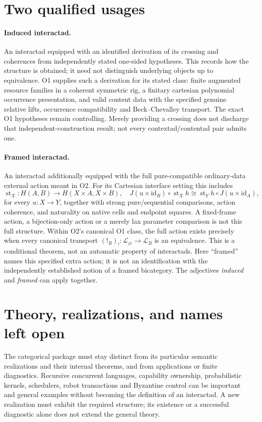 \documentclass[11pt]{article}
\begin{document}
\section{Two qualified usages}
\paragraph{Induced interactad.}
An interactad equipped with an identified derivation of its crossing and
coherences from independently stated one-sided hypotheses. This records
how the structure is obtained; it need not distinguish underlying objects
up to equivalence. O1 supplies such a derivation for its stated class:
finite augmented resource families in a coherent symmetric rig, a finitary
cartesian polynomial occurrence presentation, and valid content data with
the specified genuine relative lifts, occurrence compatibility and
Beck--Chevalley transport. The exact O1 hypotheses remain controlling.
Merely providing a crossing does not discharge that independent-construction
result; not every contextad/contentad pair admits one.

\paragraph{Framed interactad.}
An interactad additionally equipped with the full pure-compatible
ordinary-data external action meant in O2. For its Cartesian interface
setting this includes
\[
 \operatorname{st}_X:H(A,B)\to H(X\times A,X\times B),
 \quad
 J(u\times\mathrm{id}_B)\circ\operatorname{st}_Xh
 \cong\operatorname{st}_Yh\circ J(u\times\mathrm{id}_A),
\]
for every $u:X\to Y$, together with strong pure/sequential comparisons,
action coherence, and naturality on native cells and endpoint squares.
A fixed-frame action, a bijection-only action or a merely lax parameter
comparison is not this full structure. Within O2's canonical O1 class,
the full action exists precisely when every canonical transport
$(!_B)_!:\mathcal L_{\varnothing}\to\mathcal L_B$ is an equivalence.
This is a conditional theorem, not an automatic property of interactads.
Here ``framed'' names this specified extra action; it is not an identification
with the independently established notion of a framed bicategory.
The adjectives \emph{induced} and \emph{framed} can apply together.

\section{Theory, realizations, and names left open}
The categorical package must stay distinct from its particular semantic
realizations and their internal theorems, and from applications or finite
diagnostics. Recursive concurrent languages, capability ownership,
probabilistic kernels, schedulers, robot transactions and Byzantine control
can be important and general examples without becoming the definition of
an interactad. A new realization must exhibit the required structure;
its existence or a successful diagnostic alone does not extend the general
theory.
\end{document}
